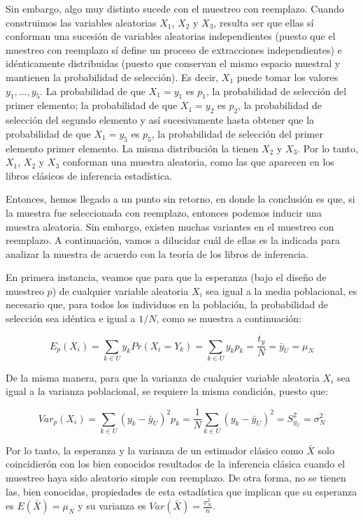 \documentclass[
  spanish,
  12pt,
]{book}
\begin{document}
Sin embargo, algo muy distinto sucede con el muestreo con reemplazo. Cuando construimos las variables aleatorias \(X_1\), \(X_2\) y \(X_3\), resulta ser que ellas sí conforman una sucesión de variables aleatorias independientes (puesto que el muestreo con reemplazo sí define un proceso de extracciones independientes) e idénticamente distribuidas (puesto que conservan el mismo espacio muestral y mantienen la probabilidad de selección). Es decir, \(X_1\) puede tomar los valores \(y_1, \ldots, y_5\). La probabilidad de que \(X_1=y_1\) es \(p_1\), la probabilidad de selección del primer elemento; la probabilidad de que \(X_1=y_2\) es \(p_2\), la probabilidad de selección del segundo elemento y así sucesivamente hasta obtener que la probabilidad de que \(X_1=y_5\) es \(p_5\), la probabilidad de selección del primer elemento primer elemento. La misma distribución la tienen \(X_2\) y \(X_3\). Por lo tanto, \(X_1\), \(X_2\) y \(X_3\) conforman una muestra aleatoria, como las que aparecen en los libros clásicos de inferencia estadística.

Entonces, hemos llegado a un punto sin retorno, en donde la conclusión es que, si la muestra fue seleccionada con reemplazo, entonces podemos inducir una muestra aleatoria. Sin embargo, existen muchas variantes en el muestreo con reemplazo. A continuación, vamos a dilucidar cuál de ellas es la indicada para analizar la muestra de acuerdo con la teoría de los libros de inferencia.

En primera instancia, veamos que para que la esperanza (bajo el diseño de muestreo \(p\)) de cualquier variable aleatoria \(X_i\) sea igual a la media poblacional, es necesario que, para todos los individuos en la población, la probabilidad de selección sea idéntica e igual a \(1/N\), como se muestra a continuación:

\[
E_p(X_i)=\sum_{k \in U} y_k Pr(X_i = Y_k) = \sum_{k \in U} y_k p_k 
= \frac{t_y}{N} = \bar{y}_U=\mu_N
\]

De la misma manera, para que la varianza de cualquier variable aleatoria \(X_i\) sea igual a la varianza poblacional, se requiere la misma condición, puesto que:

\[
Var_p(X_i)
= \sum_{k \in U} (y_k - \bar{y}_U)^2 p_k 
= \frac{1}{N}\sum_{k \in U} (y_k - \bar{y}_U)^2  = S^2_{y_U} = \sigma^2_N
\]

Por lo tanto, la esperanza y la varianza de un estimador clásico como \(\bar{X}\) solo coincidierón con los bien conocidos resultados de la inferencia clásica cuando el muestreo haya sido aleatorio simple con reemplazo. De otra forma, no se tienen las, bien conocidas, propiedades de esta estadística que implican que su esperanza es \(E(\bar{X}) = \mu_N\) y su varianza es \(Var(\bar{X}) = \frac{\sigma^2_N}{n}\).
\end{document}
